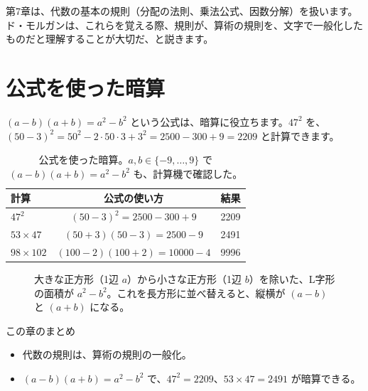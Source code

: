 \documentclass[a4paper,11pt,openany]{ltjsbook}
\begin{document}
第7章は、代数の基本の規則（分配の法則、乗法公式、因数分解）を扱います。ド・モルガンは、これらを覚える際、規則が、算術の規則を、文字で一般化したものだと理解することが大切だ、と説きます。

\section{公式を使った暗算}

$(a-b)(a+b)=a^2-b^2$ という公式は、暗算に役立ちます。$47^2$ を、$(50-3)^2=50^2-2\cdot50\cdot3+3^2=2500-300+9=2209$ と計算できます。

\begin{table}[htbp]
\centering
\begin{tabular}{lcc}
\toprule
計算 & 公式の使い方 & 結果\\
\midrule
$47^2$ & $(50-3)^2=2500-300+9$ & 2209\\
$53\times47$ & $(50+3)(50-3)=2500-9$ & 2491\\
$98\times102$ & $(100-2)(100+2)=10000-4$ & 9996\\
\bottomrule
\end{tabular}
\caption{公式を使った暗算。$a,b\in\{-9,\ldots,9\}$ で $(a-b)(a+b)=a^2-b^2$ も、計算機で確認した。}
\end{table}

\begin{figure}[htbp]
\centering
{}
\caption{大きな正方形（1辺 $a$）から小さな正方形（1辺 $b$）を除いた、L字形の面積が $a^2-b^2$。これを長方形に並べ替えると、縦横が $(a-b)$ と $(a+b)$ になる。}
\end{figure}

\begin{pointbox}{この章のまとめ}
\begin{itemize}[leftmargin=*]
\item 代数の規則は、算術の規則の一般化。
\item $(a-b)(a+b)=a^2-b^2$ で、$47^2=2209$、$53\times47=2491$ が暗算できる。
\end{itemize}
\end{pointbox}
\end{document}
